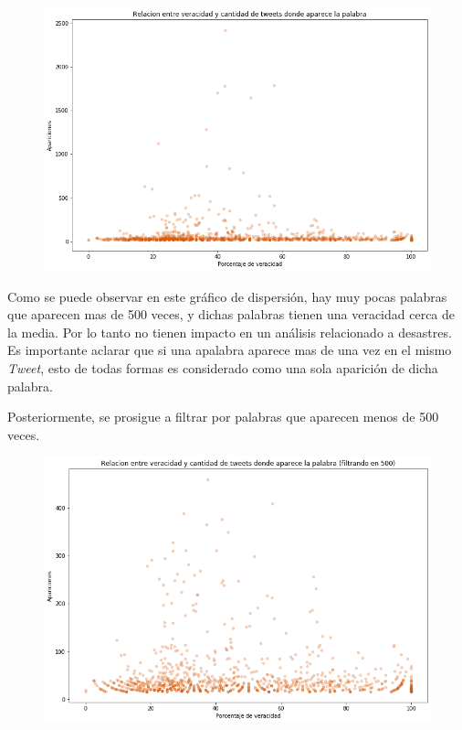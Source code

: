 \documentclass[titlepage,a4paper]{article}
\begin{document}
    \begin{figure}[H]
    \centering
    \includegraphics[width=1\textwidth]{graficos/Analisis Lexico Grafico/relacion_entre_apariciones_y_veracidad_2.png}
    \caption{} 
    \end{figure}
    
    Como se puede observar en este gráfico de dispersión, hay muy pocas palabras que aparecen mas de 500 veces, y dichas palabras tienen una veracidad cerca de la media. Por lo tanto no tienen impacto en un análisis relacionado a desastres. Es importante aclarar que si una apalabra aparece mas de una vez en el mismo \textit{Tweet}, esto de todas formas es considerado como una sola aparición de dicha palabra.
    
    Posteriormente, se prosigue a filtrar por palabras que aparecen menos de 500 veces. 
        
    \begin{figure}[H]
    \centering
    \includegraphics[width=1\textwidth]{graficos/Analisis Lexico Grafico/relacion_entre_apariciones_y_veracidad_filt_500.png}
    \caption{}   
    \end{figure}
    
\end{document}
